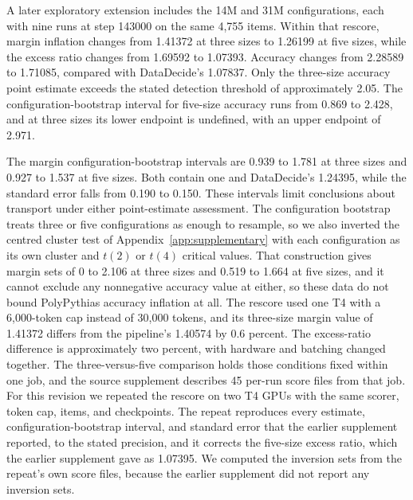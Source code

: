 A later exploratory extension includes the 14M and 31M configurations, each with nine runs at step 143000 on the same 4,755 items. Within that rescore, margin inflation changes from 1.41372 at three sizes to 1.26199 at five sizes, while the excess ratio changes from 1.69592 to 1.07393. Accuracy changes from 2.28589 to 1.71085, compared with DataDecide's 1.07837. Only the three-size accuracy point estimate exceeds the stated detection threshold of approximately 2.05. The configuration-bootstrap interval for five-size accuracy runs from 0.869 to 2.428, and at three sizes its lower endpoint is undefined, with an upper endpoint of 2.971.

The margin configuration-bootstrap intervals are 0.939 to 1.781 at three sizes and 0.927 to 1.537 at five sizes. Both contain one and DataDecide's 1.24395, while the standard error falls from 0.190 to 0.150. These intervals limit conclusions about transport under either point-estimate assessment. The configuration bootstrap treats three or five configurations as enough to resample, so we also inverted the centred cluster test of Appendix~\ref{app:supplementary} with each configuration as its own cluster and $t(2)$ or $t(4)$ critical values. That construction gives margin sets of 0 to 2.106 at three sizes and 0.519 to 1.664 at five sizes, and it cannot exclude any nonnegative accuracy value at either, so these data do not bound PolyPythias accuracy inflation at all. The rescore used one T4 with a 6,000-token cap instead of 30,000 tokens, and its three-size margin value of 1.41372 differs from the pipeline's 1.40574 by 0.6 percent. The excess-ratio difference is approximately two percent, with hardware and batching changed together. The three-versus-five comparison holds those conditions fixed within one job, and the source supplement describes 45 per-run score files from that job. For this revision we repeated the rescore on two T4 GPUs with the same scorer, token cap, items, and checkpoints. The repeat reproduces every estimate, configuration-bootstrap interval, and standard error that the earlier supplement reported, to the stated precision, and it corrects the five-size excess ratio, which the earlier supplement gave as 1.07395. We computed the inversion sets from the repeat's own score files, because the earlier supplement did not report any inversion sets.


